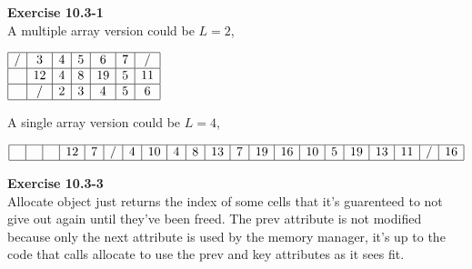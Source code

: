 \documentclass{article}
\begin{document}
\noindent\textbf{ Exercise 10.3-1} \\
A multiple array version could be $L=2$,

$
\begin{array}{|c|c|c|c|c|c|c|}
\hline
/&3&4&5&6&7&/\\

\hline
&12&4&8&19&5&11\\

\hline
&/&2&3&4&5&6\\

\hline
\end{array}
$

A single array version could be $L=4$,

$
\begin{array}{|c|c|c|c|c|c|c|c|c|c|c|c|c|c|c|c|c|c|c|c|c|}
\hline
\,\,&\,\,&\,\,&12&7&/&4&10&4&8&13&7&19&16&10&5&19&13&11&/&16\\
\hline
\end{array}
$


\noindent\textbf{ Exercise 10.3-3} \\
Allocate object just returns the index of some cells that it's guarenteed to not give out again until they've been freed. The prev attribute is not modified because only the next attribute is used by the memory manager, it's up to the code that calls allocate to use the prev and key attributes as it sees fit.\\
\end{document}
